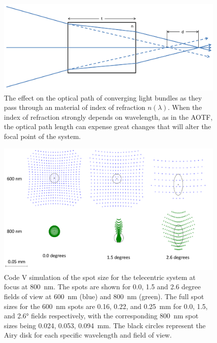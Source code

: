 \begin{figure}[h!]
    \begin{center}
    \includegraphics[width=1.0\textwidth]{./Images/3-2-OpticalPathDisplacement.pdf}
    \caption[Telecentric Optical Path Displacement]{The effect on the optical path of converging light bundles as they pass through an material of index of refraction $n(\lambda)$. When the index of refraction strongly depends on wavelength, as in the AOTF, the optical path length can expense great changes that will alter the focal point of the system.}
    \label{fig:3.2:opticalPathDisplacement}
    \end{center}
\end{figure}

\begin{figure}[h!]
    \begin{center}
    \includegraphics[width=1.0\textwidth]{./Images/3-2-TelecentricSpotSize.pdf}
    \caption[Telecentric Prototype Spot Sizes]{Code V simulation of the spot size for the telecentric system at focus at 800~nm. The spots are shown for 0.0, 1.5 and 2.6 degree fields of view at 600~nm (blue) and 800~nm (green). The full spot sizes for the 600~nm spots are 0.16, 0.22, and 0.25~mm for 0.0, 1.5, and 2.6\si{\degree} fields respectively, with the corresponding 800~nm spot sizes being 0.024, 0.053, 0.094~mm. The black circles represent the Airy disk for each specific wavelength and field of view.}
    \label{fig:3.2:telecentricSpotSize}
    \end{center}
\end{figure}

